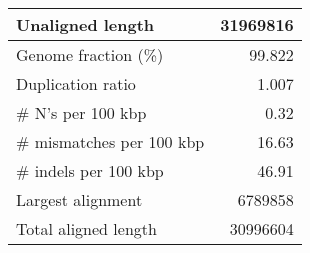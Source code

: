 \documentclass[12pt,a4paper]{article}
\begin{document}
\begin{table}[ht]
\begin{center}
\begin{tabular}{|l*{1}{|r}|}
Unaligned length & 31969816 \\ \hline
Genome fraction (\%) & 99.822 \\ \hline
Duplication ratio & 1.007 \\ \hline
\# N's per 100 kbp & 0.32 \\ \hline
\# mismatches per 100 kbp & 16.63 \\ \hline
\# indels per 100 kbp & 46.91 \\ \hline
Largest alignment & 6789858 \\ \hline
Total aligned length & 30996604 \\ \hline
\end{tabular}
\end{center}
\end{table}
\end{document}
